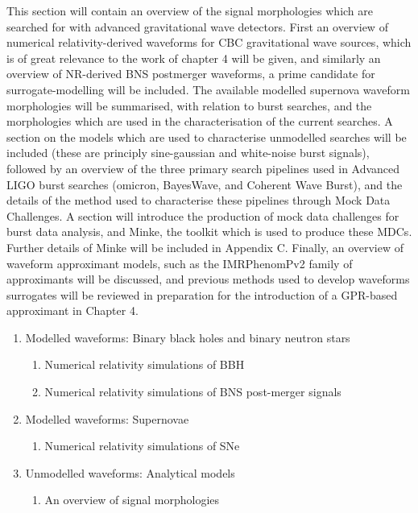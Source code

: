 \documentclass[openleft]{kentigern}
\theoremstyle{definition}
\begin{document}
\begin{enumerate}
  
  This section will contain an overview of the signal morphologies
  which are searched for with advanced gravitational wave
  detectors. First an overview of numerical relativity-derived
  waveforms for CBC gravitational wave sources, which is of great
  relevance to the work of chapter 4 will be given, and similarly an
  overview of NR-derived BNS postmerger waveforms, a prime candidate for
  surrogate-modelling will be included. The available modelled
  supernova waveform morphologies will be summarised, with relation to
  burst searches, and the morphologies which are used in the
  characterisation of the current searches. A section on the models
  which are used to characterise unmodelled searches will be included
  (these are principly sine-gaussian and white-noise burst signals),
  followed by an overview of the three primary search pipelines used
  in Advanced LIGO burst searches (omicron, BayesWave, and Coherent
  Wave Burst), and the details of the method used to characterise
  these pipelines through Mock Data Challenges. A section will
  introduce the production of mock data challenges for burst data
  analysis, and Minke, the toolkit which is used to produce these
  MDCs. Further details of Minke will be included in Appendix
  C. Finally, an overview of waveform approximant models, such as the
  IMRPhenomPv2 family of approximants will be discussed, and previous
  methods used to develop waveforms surrogates will be reviewed in
  preparation for the introduction of a GPR-based approximant in Chapter 4.

  \begin{enumerate}
  \item Modelled waveforms: Binary black holes and binary neutron stars
    \begin{enumerate}
      \item Numerical relativity simulations of BBH
      \item Numerical relativity simulations of BNS post-merger signals
    \end{enumerate}
    
  \item Modelled waveforms: Supernovae
    \begin{enumerate}
    \item Numerical relativity simulations of SNe
    \end{enumerate}
    
  \item Unmodelled waveforms: Analytical models
    \begin{enumerate}
    \item An overview of signal morphologies
    \end{enumerate}
    

\end{enumerate}
\end{enumerate}
\end{document}
